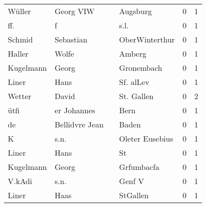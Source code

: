 \begin{center}
\begin{tiny}
\begin{longtabu}{llllrr}
                   Wüller &                          Georg VIW &             &                                    Augsburg &          0 &         1 \\
                      ff. &                                  f &             &                                        s.l. &          0 &         1 \\
                   Schmid &                          Sebastian &             &                              OberWinterthur &          0 &         1 \\
                   Haller &                              Wolfe &             &                                      Amberg &          0 &         1 \\
                Kugelmann &                              Georg &             &                                  Gronembach &          0 &         1 \\
                    Liner &                               Hans &             &                                   Sf. alLev &          0 &         1 \\
                   Wetter &                              David &             &                                  St. Gallen &          0 &         2 \\
                     ütfi &                        er Johannes &             &                                        Bern &          0 &         1 \\
                       de &                     Bellidvre Jean &             &                                       Baden &          0 &         1 \\
                        K &                               s.n. &             &                             Oleter Eusebius &          0 &         1 \\
                    Liner &                               Hans &             &                                          St &          0 &         1 \\
                Kugelmann &                              Georg &             &                                  Grfumbacfa &          0 &         1 \\
                   V.kAdi &                               s.n. &             &                                      Genf V &          0 &         1 \\
                    Liner &                               Haas &             &                                    StGallen &          0 &         1 \\

\end{longtabu}
\end{tiny}
\end{center}
